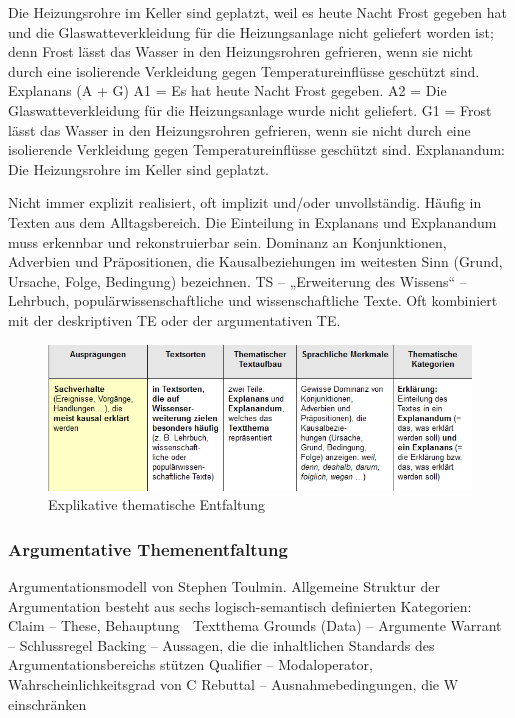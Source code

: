 \documentclass[
  letterpaper,
]{scrbook}
\begin{document}
Die Heizungsrohre im Keller sind geplatzt, weil es heute Nacht Frost
gegeben hat und die Glaswatteverkleidung für die Heizungsanlage nicht
geliefert worden ist; denn Frost lässt das Wasser in den Heizungsrohren
gefrieren, wenn sie nicht durch eine isolierende Verkleidung gegen
Temperatureinflüsse geschützt sind. Explanans (A + G) A1 = Es hat heute
Nacht Frost gegeben. A2 = Die Glaswatteverkleidung für die
Heizungsanlage wurde nicht geliefert. G1 = Frost lässt das Wasser in den
Heizungsrohren gefrieren, wenn sie nicht durch eine isolierende
Verkleidung gegen Temperatureinflüsse geschützt sind. Explanandum: Die
Heizungsrohre im Keller sind geplatzt.

Nicht immer explizit realisiert, oft implizit und/oder unvollständig.
Häufig in Texten aus dem Alltagsbereich. Die Einteilung in Explanans und
Explanandum muss erkennbar und rekonstruierbar sein. Dominanz an
Konjunktionen, Adverbien und Präpositionen, die Kausalbeziehungen im
weitesten Sinn (Grund, Ursache, Folge, Bedingung) bezeichnen. TS --
„Erweiterung des Wissens`` -- Lehrbuch, populärwissenschaftliche und
wissenschaftliche Texte. Oft kombiniert mit der deskriptiven TE oder der
argumentativen TE.

\begin{figure}

{\centering \includegraphics[width=1\textwidth,height=\textheight]{./pictures/Themenentfaltung_explikative.png}

}

\caption{Explikative thematische Entfaltung}

\end{figure}

\hypertarget{argumentative-themenentfaltung}{%
\subsubsection{Argumentative
Themenentfaltung}\label{argumentative-themenentfaltung}}

Argumentationsmodell von Stephen Toulmin. Allgemeine Struktur der
Argumentation besteht aus sechs logisch-semantisch definierten
Kategorien: Claim -- These, Behauptung  Textthema Grounds (Data) --
Argumente Warrant -- Schlussregel Backing -- Aussagen, die die
inhaltlichen Standards des Argumentationsbereichs stützen Qualifier --
Modaloperator, Wahrscheinlichkeitsgrad von C Rebuttal --
Ausnahmebedingungen, die W einschränken
\end{document}

